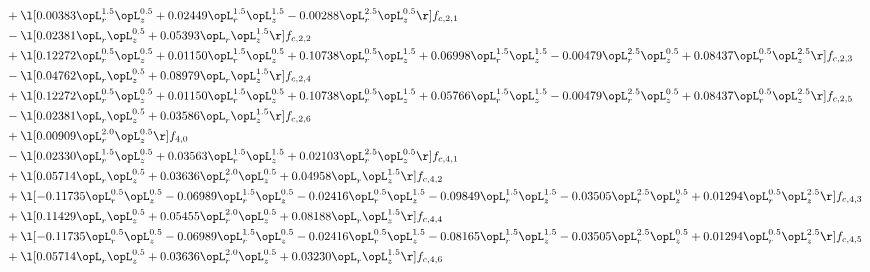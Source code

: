 \begin{alignat}{2}
& + \l[  0.00383 \opL_r^{1.5} \opL_z^{0.5} +  0.02449 \opL_r^{1.5} \opL_z^{1.5}   -0.00288 \opL_r^{2.5} \opL_z^{0.5}  \r] f_{c,2,1} \nonumber \\ 
& - \l[  0.02381 \opL_r \opL_z^{0.5} +  0.05393 \opL_r \opL_z^{1.5}  \r] f_{c,2,2} \nonumber \\ 
& + \l[  0.12272 \opL_r^{0.5} \opL_z^{0.5} +  0.01150 \opL_r^{1.5} \opL_z^{0.5} +  0.10738 \opL_r^{0.5} \opL_z^{1.5} +  0.06998 \opL_r^{1.5} \opL_z^{1.5}   -0.00479 \opL_r^{2.5} \opL_z^{0.5} +  0.08437 \opL_r^{0.5} \opL_z^{2.5}  \r] f_{c,2,3} \nonumber \\ 
& - \l[  0.04762 \opL_r \opL_z^{0.5} +  0.08979 \opL_r \opL_z^{1.5}  \r] f_{c,2,4} \nonumber \\ 
& + \l[  0.12272 \opL_r^{0.5} \opL_z^{0.5} +  0.01150 \opL_r^{1.5} \opL_z^{0.5} +  0.10738 \opL_r^{0.5} \opL_z^{1.5} +  0.05766 \opL_r^{1.5} \opL_z^{1.5}   -0.00479 \opL_r^{2.5} \opL_z^{0.5} +  0.08437 \opL_r^{0.5} \opL_z^{2.5}  \r] f_{c,2,5} \nonumber \\ 
& - \l[  0.02381 \opL_r \opL_z^{0.5} +  0.03586 \opL_r \opL_z^{1.5}  \r] f_{c,2,6} \nonumber \\ 
& + \l[  0.00909 \opL_r^{2.0} \opL_z^{0.5}  \r] f_{4,0} \nonumber \\ 
& - \l[  0.02330 \opL_r^{1.5} \opL_z^{0.5} +  0.03563 \opL_r^{1.5} \opL_z^{1.5} +  0.02103 \opL_r^{2.5} \opL_z^{0.5}  \r] f_{c,4,1} \nonumber \\ 
& + \l[  0.05714 \opL_r \opL_z^{0.5} +  0.03636 \opL_r^{2.0} \opL_z^{0.5} +  0.04958 \opL_r \opL_z^{1.5}  \r] f_{c,4,2} \nonumber \\ 
& + \l[  -0.11735 \opL_r^{0.5} \opL_z^{0.5}   -0.06989 \opL_r^{1.5} \opL_z^{0.5}   -0.02416 \opL_r^{0.5} \opL_z^{1.5}   -0.09849 \opL_r^{1.5} \opL_z^{1.5}   -0.03505 \opL_r^{2.5} \opL_z^{0.5} +  0.01294 \opL_r^{0.5} \opL_z^{2.5}  \r] f_{c,4,3} \nonumber \\ 
& + \l[  0.11429 \opL_r \opL_z^{0.5} +  0.05455 \opL_r^{2.0} \opL_z^{0.5} +  0.08188 \opL_r \opL_z^{1.5}  \r] f_{c,4,4} \nonumber \\ 
& + \l[  -0.11735 \opL_r^{0.5} \opL_z^{0.5}   -0.06989 \opL_r^{1.5} \opL_z^{0.5}   -0.02416 \opL_r^{0.5} \opL_z^{1.5}   -0.08165 \opL_r^{1.5} \opL_z^{1.5}   -0.03505 \opL_r^{2.5} \opL_z^{0.5} +  0.01294 \opL_r^{0.5} \opL_z^{2.5}  \r] f_{c,4,5} \nonumber \\ 
& + \l[  0.05714 \opL_r \opL_z^{0.5} +  0.03636 \opL_r^{2.0} \opL_z^{0.5} +  0.03230 \opL_r \opL_z^{1.5}  \r] f_{c,4,6} \nonumber \\ 

\end{alignat}
